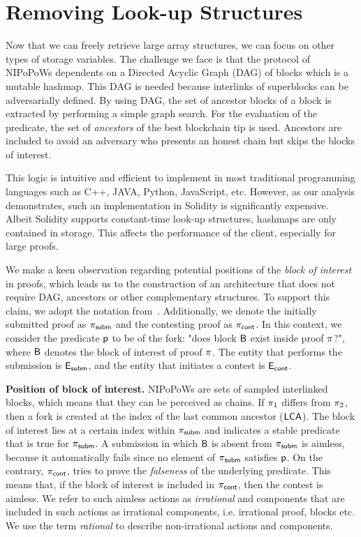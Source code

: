 \section{Removing Look-up Structures}

Now that we can freely retrieve large array structures, we can focus on other
types of storage variables. The challenge we face is that the protocol of
NIPoPoWs dependents on a Directed Acyclic Graph (DAG) of blocks which is a
mutable hashmap. This DAG is needed because interlinks of superblocks can be
adversarially defined. By using DAG, the set of ancestor blocks of a block is
extracted by performing a simple graph search. For the evaluation of the
predicate, the set of \emph{ancestors} of the best blockchain tip is used.
Ancestors are included to avoid an adversary who presents an honest chain but
skips the blocks of interest.

This logic is intuitive and efficient to implement in most traditional
programming languages such as C++, JAVA, Python, JavaScript, etc. However, as
our analysis demonstrates, such an implementation in Solidity is significantly
expensive. Albeit Solidity supports constant-time look-up structures, hashmaps
are only contained in storage. This affects the performance of the client,
especially for large proofs.

We make a keen observation regarding potential positions of the \emph{block of
interest} in proofs, which leads us to the construction of an architecture that
does not require DAG, ancestors or other complementary structures. To support
this claim, we adopt the notation from~\cite{nipopows}.  Additionally, we
denote the initially submitted proof as $\mathsf{\pi_{subm}}$ and the contesting proof as
$\mathsf{\pi_{cont}}$. In this context, we consider the predicate $\mathsf{p}$ to be of the fork: "does block
$\mathsf{B}$ exist inside proof $\mathsf{\pi}$?", where $\mathsf{B}$ denotes the block of interest
of proof $\mathsf{\pi}$. The entity that performs the submission is $\mathsf{E_{subm}}$, and the entity
that initiates a contest is $\mathsf{E_{cont}}$.

\noindent \textbf{Position of block of interest.} NIPoPoWs are sets of sampled
interlinked blocks, which means that they can be perceived as chains. If
$\mathsf{\pi}_1$ differs from $\mathsf{\pi}_2$, then a fork is created at the index of the last
common ancestor ($\mathsf{LCA}$). The block of interest lies at a certain index within
$\mathsf{\pi_{subm}}$ and indicates a stable predicate~\cite{nipopows, generic-client} that is
true for $\mathsf{\pi_{subm}}$. A submission in which $\mathsf{B}$ is absent from $\mathsf{\pi_{subm}}$ is
aimless, because it automatically fails since no element of $\mathsf{\pi_{subm}}$ satisfies
$\mathsf{p}$. On the contrary, $\mathsf{\pi_{cont}}$, tries to prove the \emph{falseness} of the
underlying predicate. This means that, if the block of interest is included in
$\mathsf{\pi_{cont}}$, then the contest is aimless. We refer to such aimless actions as
\emph{irrational} and components that are included in such actions as
irrational components, i.e.  irrational proof, blocks etc. We use the term
\emph{rational} to describe non-irrational actions and components.

